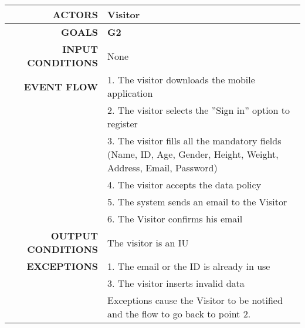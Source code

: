 \begin{table}[h!]
\begin{tabular}{|r|p{3in}|}
\hline
\textbf{ACTORS} & Visitor\\
\hline
\textbf{GOALS} & \textbf{G2} \\
\hline
\textbf{INPUT CONDITIONS} & None \\
\hline
\textbf{EVENT FLOW} 
&1. The visitor downloads the mobile application \\
&2. The visitor selects the ''Sign in'' option to register \\
&3. The visitor fills all the mandatory fields (Name, ID, Age, Gender, Height, Weight, Address, Email, Password) \\
&4. The visitor accepts the data policy \\
&5. The system sends an email to the Visitor \\
&6. The Visitor confirms his email \\
\hline
\textbf{OUTPUT CONDITIONS} & The visitor is an IU \\
\hline
\textbf{EXCEPTIONS}
&1. The email or the ID is already in use \\
&3. The visitor inserts invalid data \\
&Exceptions cause the Visitor to be notified and the flow to go back to point 2.\\
\hline
\end{tabular}
\end{table}